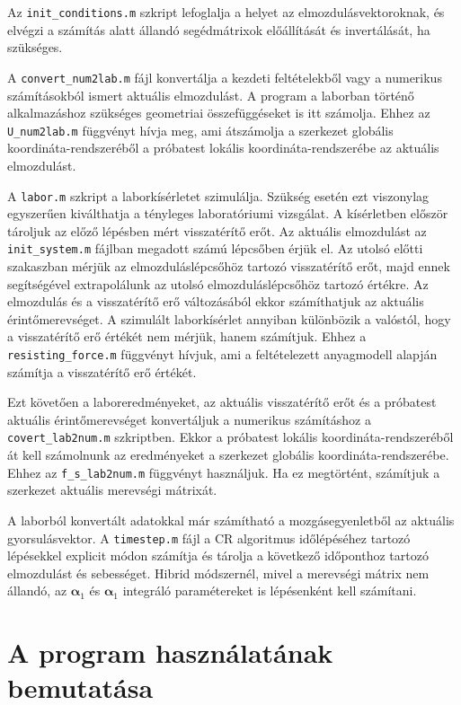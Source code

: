 Az \verb|init_conditions.m| szkript lefoglalja a helyet az elmozdulásvektoroknak, és elvégzi a számítás alatt állandó segédmátrixok előállítását és invertálását, ha szükséges. 

A \verb|convert_num2lab.m| fájl konvertálja a kezdeti feltételekből vagy a numerikus számításokból ismert aktuális elmozdulást. A program a laborban történő alkalmazáshoz szükséges geometriai összefüggéseket is itt számolja. Ehhez az \verb|U_num2lab.m| függvényt hívja meg, ami átszámolja a szerkezet globális koordináta-rendszeréből a próbatest lokális koordináta-rendszerébe az aktuális elmozdulást.

A \verb|labor.m| szkript a laborkísérletet szimulálja. Szükség esetén ezt viszonylag egyszerűen kiválthatja  a tényleges laboratóriumi vizsgálat. A  kísérletben először tároljuk az előző lépésben mért visszatérítő erőt. Az aktuális elmozdulást az \verb|init_system.m| fájlban megadott számú lépcsőben érjük el. Az utolsó előtti szakaszban mérjük az elmozduláslépcsőhöz tartozó visszatérítő erőt, majd ennek segítségével extrapolálunk az utolsó elmozduláslépcsőhöz tartozó értékre. Az elmozdulás és a visszatérítő erő változásából ekkor számíthatjuk az aktuális érintőmerevséget. A szimulált laborkísérlet annyiban különbözik a valóstól, hogy a visszatérítő erő  értékét nem mérjük, hanem számítjuk. Ehhez a \verb|resisting_force.m| függvényt hívjuk, ami a feltételezett anyagmodell alapján számítja a visszatérítő erő értékét. 

Ezt követően a laboreredményeket, az aktuális visszatérítő erőt és a próbatest aktuális érintőmerevséget konvertáljuk a numerikus számításhoz a \verb|covert_lab2num.m| szkriptben. Ekkor a próbatest lokális koordináta-rendszeréből át kell számolnunk az eredményeket a szerkezet globális koordináta-rendszerébe. Ehhez az \verb|f_s_lab2num.m| függvényt használjuk. Ha ez megtörtént, számítjuk a szerkezet aktuális merevségi mátrixát. 

A laborból konvertált adatokkal már számítható a mozgásegyenletből  az aktuális gyorsulásvektor. A \verb|timestep.m| fájl a CR algoritmus időlépéséhez tartozó lépésekkel  explicit módon számítja és tárolja a következő időponthoz tartozó elmozdulást és sebességet. Hibrid módszernél, mivel a merevségi mátrix nem állandó, az $\boldsymbol\alpha_1$
 és  $\boldsymbol\alpha_1$ integráló paramétereket is lépésenként kell számítani. 


\section{A program használatának bemutatása}\label{sec:hibr_példa}

